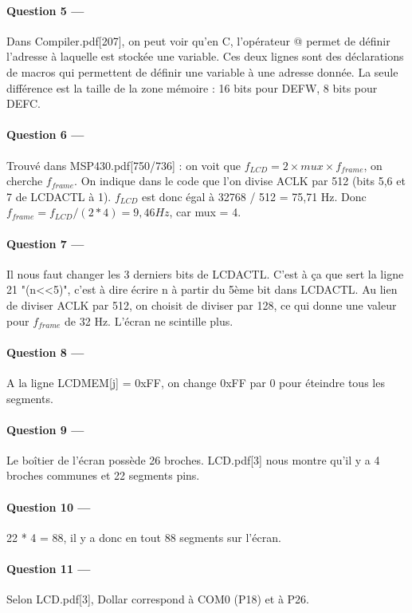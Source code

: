 \documentclass[a4paper,11pt,article]{memoir}
\begin{document}
\paragraph{Question 5 ---}  Dans Compiler.pdf[207], on peut voir qu'en C, l'opérateur @ permet de définir l'adresse à laquelle est stockée une variable. Ces deux lignes sont des déclarations de macros qui permettent de définir une variable à une adresse donnée. La seule différence est la taille de la zone mémoire : 16 bits pour DEFW, 8 bits pour DEFC.

\paragraph{Question 6 ---}  Trouvé dans MSP430.pdf[750/736] : on voit que \(f_{LCD} = 2 \times mux \times f_{frame}\), on cherche $f_{frame}$. On indique dans le code que l'on divise ACLK par 512 (bits 5,6 et 7 de LCDACTL à 1). $f_{LCD}$ est donc égal à 32768 / 512 = 75,71 Hz. Donc $f_{frame} = f_{LCD} / (2 * 4) = 9,46Hz$, car mux = 4.

\paragraph{Question 7 ---}  Il nous faut changer les 3 derniers bits de LCDACTL. C'est à ça que sert la ligne 21 "(n<<5)", c'est à dire écrire n à partir du 5ème bit dans LCDACTL. Au lien de diviser ACLK par 512, on choisit de diviser par 128, ce qui donne une valeur pour $f_{frame}$ de 32 Hz. L'écran ne scintille plus.

\paragraph{Question 8 ---}  A la ligne LCDMEM[j] = 0xFF, on change 0xFF par 0 pour éteindre tous les segments.

\paragraph{Question 9 ---}  Le boîtier de l'écran possède 26 broches. LCD.pdf[3] nous montre qu'il y a 4 broches communes et 22 segments pins.

\paragraph{Question 10 ---}  22 * 4 = 88, il y a donc en tout 88 segments sur l'écran.

\paragraph{Question 11 ---}  Selon LCD.pdf[3], Dollar correspond à COM0 (P18) et à P26.
\end{document}
